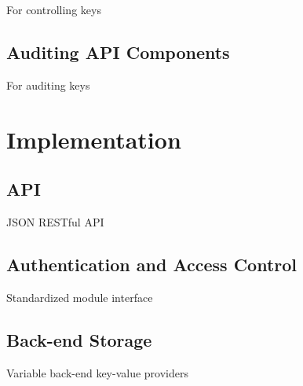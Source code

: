 For controlling keys

\subsection{Auditing API Components}

For auditing  keys

\section{Implementation}

\subsection{API}

JSON RESTful API

\subsection{Authentication and Access Control}

Standardized module interface

\subsection{Back-end Storage}

Variable back-end key-value providers

